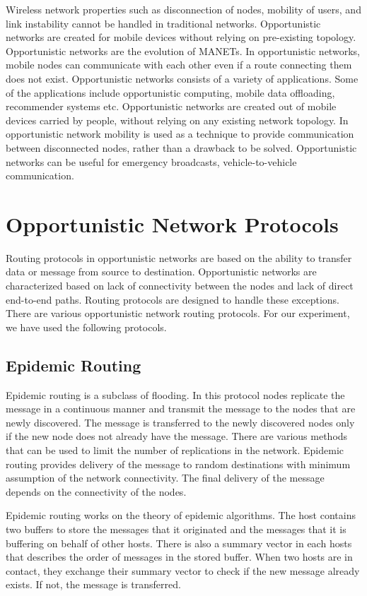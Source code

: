 \documentclass[conference]{IEEEtran}
\begin{document}
Wireless network properties such as disconnection of nodes, mobility of users, and link instability cannot be handled in traditional networks. Opportunistic networks are created for mobile devices without relying on pre-existing topology. Opportunistic networks are the evolution of MANETs. In opportunistic networks, mobile nodes can communicate with each other even if a route connecting them does not exist. Opportunistic networks consists of a variety of applications. Some of the applications include opportunistic computing, mobile data offloading, recommender systems etc. Opportunistic networks are created out of mobile devices carried by people, without relying on any existing network topology. In opportunistic network mobility is used as a technique to provide communication between disconnected nodes, rather than a drawback to be solved. Opportunistic networks can be useful for emergency broadcasts, vehicle-to-vehicle communication.



\section{Opportunistic Network Protocols}
Routing protocols in opportunistic networks are based on the ability to transfer data or message from source to destination. Opportunistic networks are characterized based on lack of connectivity between the nodes and lack of direct end-to-end paths. Routing protocols are designed to handle these exceptions. There are various opportunistic network routing protocols. For our experiment, we have used the following protocols.

\subsection{Epidemic Routing}  
Epidemic routing \cite{epidemic} is a subclass of flooding. In this protocol nodes replicate the message in a continuous manner and transmit the message to the nodes that are newly discovered. The message is transferred to the newly discovered nodes only if the new node does not already have the message. There are various methods that can be used to limit the number of replications in the network. Epidemic routing provides delivery of the message to random destinations with minimum assumption of the network connectivity. The final delivery of the message depends on the connectivity of the nodes. 

Epidemic routing works on the theory of epidemic algorithms. The host contains two buffers to store the messages that it originated and the messages that it is buffering on behalf of other hosts. There is also a summary vector in each hosts that describes the order of messages in the stored buffer. When two hosts are in contact, they exchange their summary vector to check if the new message already exists. If not, the message is transferred. 
\end{document}
